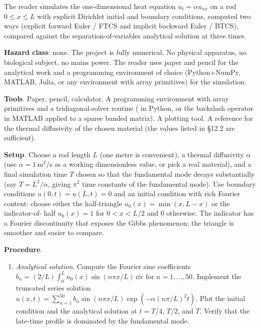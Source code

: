 \begin{project}
The reader simulates the one-dimensional heat equation $u_{t} =
\alpha u_{xx}$ on a rod $0 \leq x \leq L$ with explicit Dirichlet
initial and boundary conditions, computed two ways (explicit
forward Euler / FTCS and implicit backward Euler / BTCS), compared
against the separation-of-variables analytical solution at three
times.

\textbf{Hazard class}: none. The project is fully numerical. No
physical apparatus, no biological subject, no mains power. The
reader uses paper and pencil for the analytical work and a
programming environment of choice (Python+NumPy, MATLAB, Julia,
or any environment with array primitives) for the simulation.

\textbf{Tools}. Paper, pencil, calculator. A programming
environment with array primitives and a tridiagonal-solver
routine ( in Python, or the
backslash operator in MATLAB applied to a sparse banded matrix).
A plotting tool. A reference for the thermal diffusivity of the
chosen material (the values listed in §12.2 are sufficient).

\textbf{Setup}. Choose a rod length $L$ (one metre is convenient),
a thermal diffusivity $\alpha$ (use $\alpha = 1\,\si{\meter\squared
\per\second}$ as a working dimensionless value, or pick a real
material), and a final simulation time $T$ chosen so that the
fundamental mode decays substantially (say $T = L^{2}/\alpha$,
giving $\pi^{2}$ time constants of the fundamental mode). Use
boundary conditions $u(0, t) = u(L, t) = 0$ and an initial
condition with rich Fourier content: choose either the
half-triangle $u_{0}(x) = \min(x, L - x)$ or the indicator-of-
half $u_{0}(x) = 1$ for $0 < x < L/2$ and $0$ otherwise. The
indicator has a Fourier discontinuity that exposes the Gibbs
phenomenon; the triangle is smoother and easier to compare.

\textbf{Procedure}.

\begin{enumerate}[leftmargin=*]
  \item \emph{Analytical solution}. Compute the Fourier sine
    coefficients $b_{n} = (2/L)\int_{0}^{L} u_{0}(x) \sin(n\pi
    x/L)\,\dd x$ for $n = 1, \ldots, 50$. Implement the
    truncated series solution $u(x, t) = \sum_{n = 1}^{50} b_{n}
    \sin(n \pi x/L) \exp(-\alpha (n \pi/L)^{2} t)$. Plot the
    initial condition and the analytical solution at $t = T/4$,
    $T/2$, and $T$. Verify that the late-time profile is
    dominated by the fundamental mode.


\end{enumerate}
\end{project}
